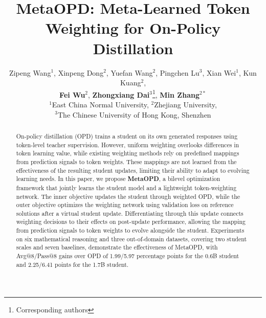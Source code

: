 \documentclass{article}
\title{MetaOPD: Meta-Learned Token Weighting for On-Policy Distillation}
\author{Zipeng Wang$^{1}$, 
Xinpeng Dong$^{2}$, 
Yuefan Wang$^{2}$, 
Pingchen Lu$^{3}$, 
Xian Wei$^{1}$, 
Kun Kuang$^{2}$, \\
\textbf{Fei Wu}$^{2}$, 
\textbf{Zhongxiang Dai}$^{3}$\thanks{Corresponding authors}\hspace{1.6mm}, 
\textbf{Min Zhang}$^{2*}$\\
$^{1}$East China Normal University,
$^{2}$Zhejiang University, \\
$^{3}$The Chinese University of Hong Kong, Shenzhen
}
\theoremstyle{plain}
\theoremstyle{definition}
\theoremstyle{remark}
\begin{document}
\maketitle


\begin{abstract}

On-policy distillation (OPD) trains a student on its own generated responses using token-level teacher supervision. However, uniform weighting overlooks differences in token learning value, while existing weighting methods rely on predefined mappings from prediction signals to token weights. These mappings are not learned from the effectiveness of the resulting student updates, limiting their ability to adapt to evolving learning needs. In this paper, we propose \textbf{MetaOPD}, a bilevel optimization framework that jointly learns the student model and a lightweight token-weighting network. The inner objective updates the student through weighted OPD, while the outer objective optimizes the weighting network using validation loss on reference solutions after a virtual student update. Differentiating through this update connects weighting decisions to their effects on post-update performance, allowing the mapping from prediction signals to token weights to evolve alongside the student. Experiments on six mathematical reasoning and three out-of-domain datasets, covering two student scales and seven baselines, demonstrate the effectiveness of MetaOPD, with Avg@8/Pass@8 gains over OPD of 1.99/5.97 percentage points for the 0.6B student and 2.25/6.41 points for the 1.7B student.
\end{abstract}
\end{document}
